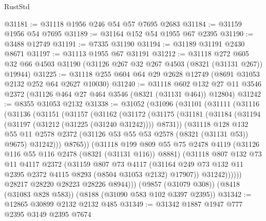 \begin{lexlean}{RustStd}
\begin{coremodule}
@31181 := @31118 @1956 @246 @54 @57 @7695 @2683
@31184 := @31159 @1956 @54 @7695
@31189 := @31164 @152 @54 @1955 @67 @2395
@31190 := @3488 @12749
@31191 := @7335 @31190
@31194 := @31189 @31191 @2430 @8671
@31197 := @31113 @1955 @67 @31191
@31212 := @31118
    @272
    @605
    @32
    @66
    @4503
    @31190
    (@31126 @267 @32 @267 @4503 (@8321 (@31131 @267)) @19944)
@31225 := @31118 @255 @604 @64 @29 @2628 @12749 (@8691 @31053 @2132 @252 @64 @2627 @10030)
@31240 := @31118
    @602
    @132
    @27
    @11
    @3546
    @2372
    (@31126 @464 @27 @464 @3546 (@8321 (@31131 @464)) @12804)
@31242 := @8355 @31053 @2132
@31338 := @31052
    (@31096
      (@31101
        (@31111
          (@31116
            (@31136
              (@31151
                (@31157
                  (@31162
                    (@31172
                      (@31175
                        (@31181
                          (@31184 (@31194 (@31197 (@31212 (@31225 (@31240 @31242)))) @8731))
                          (@31118
                            @128
                            @132
                            @55
                            @11
                            @2578
                            @2372
                            (@31126 @53 @55 @53 @2578 (@8321 (@31131 @53)) @9675)
                            @31242)))
                      @8765))
                  (@31118
                    @199
                    @809
                    @55
                    @75
                    @2478
                    @4119
                    (@31126 @116 @55 @116 @2478 (@8321 (@31131 @116)) @8881)
                    (@31118
                      @807
                      @132
                      @73
                      @11
                      @4117
                      @2372
                      (@31159
                        @807
                        @73
                        @4117
                        (@31164
                          @249
                          @73
                          @132
                          @11
                          @2395
                          @2372
                          @4115
                          @8293
                          (@8504 @31053 @2132)
                          @17907))
                      @31242))))))
          @28217
          @28220
          @28223
          @28226
          @8944)))
    (@9857 (@31079 @308))
    (@8418 (@31083 @828 @583))
    (@8188 (@31090 @583 @102 @3397 @2395))
@31342 := @12865 @30899 @2132 @2132 @485
@31349 := @31342 @1887 @1947 @777 @2395 @3149 @2395 @7674

\end{coremodule}
\end{lexlean}
